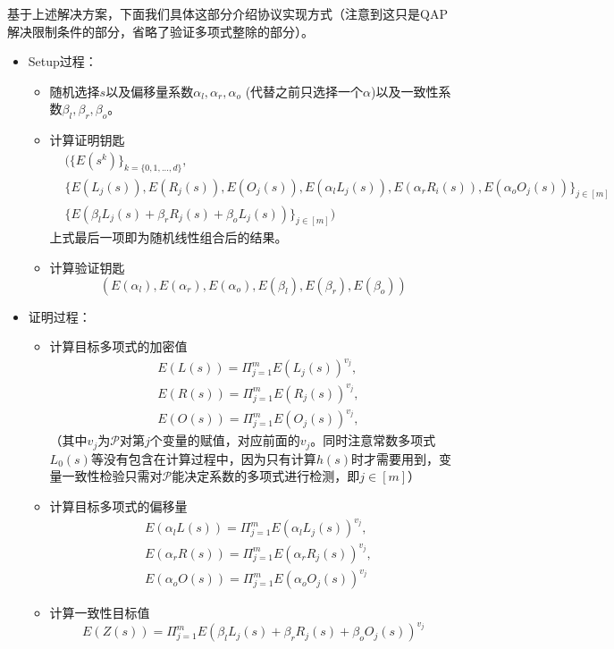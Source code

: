 \documentclass[12pt]{article}
\newcommand{\pp}{$\mathcal{P}$}
\begin{document}
基于上述解决方案，下面我们具体这部分介绍协议实现方式（注意到这只是QAP解决限制条件的部分，省略了验证多项式整除的部分）。
\begin{itemize}
	\item Setup过程：
	\begin{itemize}
	   \item  随机选择$s$以及偏移量系数$\alpha_l,\alpha_r,\alpha_o$ (代替之前只选择一个$\alpha$)以及一致性系数$\beta_l,\beta_r,\beta_o$。
	   \item 计算证明钥匙
	   \begin{align*}
	    &\big( \{E(s^k)\}_{k=\{0,1,...,d\}}, \\
	    & \{E(L_j(s)),E(R_j(s)),E(O_j(s)),E(\alpha_l L_j(s)), E(\alpha_r R_i(s)),E(\alpha_o O_j(s))\}_{j \in [m]}\\
	    & \{ E(\beta_l L_j(s)+\beta_r R_j(s)+\beta_o L_j(s))\}_{j \in [m]} \big)
	   \end{align*}
	   上式最后一项即为随机线性组合后的结果。
	   	   \item 计算验证钥匙
	   	   $$(E(\alpha_l),E(\alpha_r),E(\alpha_o),E(\beta_l),E(\beta_r),E(\beta_o))$$
	 \end{itemize}
     \item 证明过程：
     \begin{itemize}
     	\item 计算目标多项式的加密值
     	  \begin{align*}
     	  &E(L(s))= \Pi_{j=1}^m E(L_j(s))^{v_j},\\
     	&  E(R(s))= \Pi_{j=1}^m E(R_j(s))^{v_j},\\
     	&  E(O(s))= \Pi_{j=1}^m E(O_j(s))^{v_j},
     	  \end{align*}
     	  （其中$v_j$为\pp 对第$j$个变量的赋值，对应前面的$v_j$。同时注意常数多项式$L_0(s)$等没有包含在计算过程中，因为只有计算$h(s)$时才需要用到，变量一致性检验只需对\pp 能决定系数的多项式进行检测，即$j \in [m]$）
     	\item 计算目标多项式的偏移量
     	     	  \begin{align*}
     	&E(\alpha_l L(s))= \Pi_{j=1}^m E(\alpha_l L_j(s))^{v_j},\\
     	&E(\alpha_r R(s))= \Pi_{j=1}^m E(\alpha_r R_j(s))^{v_j},\\
     	&E(\alpha_o O(s))= \Pi_{j=1}^m E(\alpha_o O_j(s))^{v_j}
     	     	  \end{align*}
     	 \item 计算一致性目标值
     	 $$E(Z(s))=\Pi_{j=1}^m E(\beta_l L_j(s)+\beta_r R_j(s)+\beta_o O_j(s))^{v_j}$$

\end{itemize}
\end{itemize}
\end{document}
